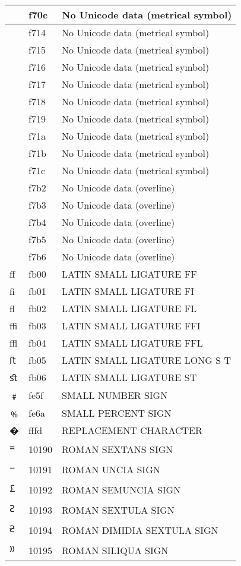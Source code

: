 \documentclass[12pt,letterpaper,openany]{book}
\begin{document}
\begin{center}
\begin{supertabular}{|m{0.25in}|m{0.5in}|m{4in}|}
 & f70c & No Unicode data (metrical symbol)\\\hline
 & f714 & No Unicode data (metrical symbol)\\\hline
 & f715 & No Unicode data (metrical symbol)\\\hline
 & f716 & No Unicode data (metrical symbol)\\\hline
 & f717 & No Unicode data (metrical symbol)\\\hline
 & f718 & No Unicode data (metrical symbol)\\\hline
 & f719 & No Unicode data (metrical symbol)\\\hline
 & f71a & No Unicode data (metrical symbol)\\\hline
 & f71b & No Unicode data (metrical symbol)\\\hline
 & f71c & No Unicode data (metrical symbol)\\\hline
 & f7b2 & No Unicode data (overline)\\\hline
 & f7b3 & No Unicode data (overline)\\\hline
 & f7b4 & No Unicode data (overline)\\\hline
 & f7b5 & No Unicode data (overline)\\\hline
 & f7b6 & No Unicode data (overline)\\\hline
ﬀ & fb00 & LATIN SMALL LIGATURE FF\\\hline
ﬁ & fb01 & LATIN SMALL LIGATURE FI\\\hline
ﬂ & fb02 & LATIN SMALL LIGATURE FL\\\hline
ﬃ & fb03 & LATIN SMALL LIGATURE FFI\\\hline
ﬄ & fb04 & LATIN SMALL LIGATURE FFL\\\hline
ﬅ & fb05 & LATIN SMALL LIGATURE LONG S T\\\hline
ﬆ & fb06 & LATIN SMALL LIGATURE ST\\\hline
﹟ & fe5f & SMALL NUMBER SIGN\\\hline
﹪ & fe6a & SMALL PERCENT SIGN\\\hline
� & fffd & REPLACEMENT CHARACTER\\\hline
𐆐 & 10190 & ROMAN SEXTANS SIGN\\\hline
𐆑 & 10191 & ROMAN UNCIA SIGN\\\hline
𐆒 & 10192 & ROMAN SEMUNCIA SIGN\\\hline
𐆓 & 10193 & ROMAN SEXTULA SIGN\\\hline
𐆔 & 10194 & ROMAN DIMIDIA SEXTULA SIGN\\\hline
𐆕 & 10195 & ROMAN SILIQUA SIGN\\\hline

\end{supertabular}
\end{center}
\end{document}
